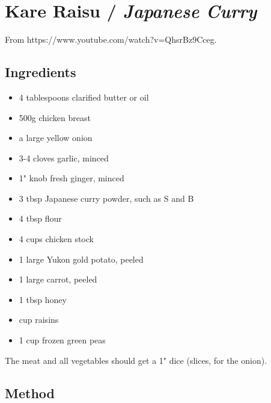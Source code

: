 \section{Kare Raisu / \emph{Japanese Curry}}


From https://www.youtube.com/watch?v=QhsrBz9Cceg.

\subsection{Ingredients}

\begin{itemize}
	\item 4 tablespoons clarified butter or oil
	\item 500g chicken breast
	\item {} a large yellow onion
	\item 3-4 cloves garlic, minced
	\item 1" knob fresh ginger, minced
	\item 3 tbsp Japanese curry powder, such as S and B
	\item 4 tbsp flour
	\item 4 cups chicken stock
	\item 1 large Yukon gold potato, peeled
	\item 1 large carrot, peeled
	\item 1 tbsp honey
	\item {} cup raisins
	\item 1 cup frozen green peas
\end{itemize}

The meat and all vegetables should get a 1" dice (slices, for the onion).

\subsection{Method}

